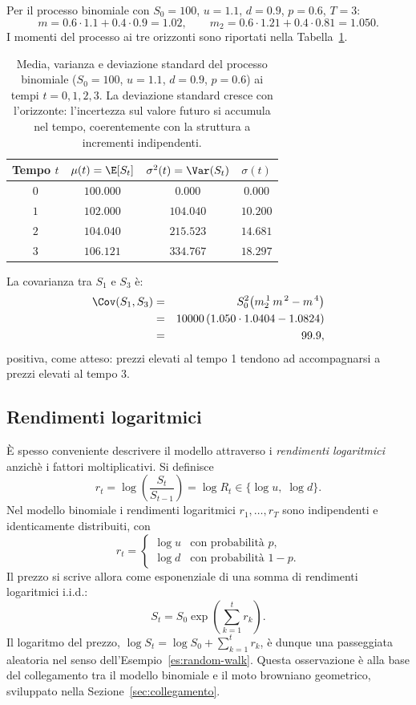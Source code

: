 \begin{example}
\label{es:momenti-binomiale}
Per il processo binomiale con $S_0=100$, $u=1.1$, $d=0.9$, $p=0.6$,
$T=3$:
\[
m=0.6\cdot 1.1+0.4\cdot 0.9=1.02,
\qquad
m_2=0.6\cdot 1.21+0.4\cdot 0.81=1.050.
\]
I momenti del processo ai tre orizzonti sono riportati nella
Tabella~\ref{tab:momenti-binomiale}.

\begin{table}[h]
\centering
\begin{tabular}{|c|c|c|c|}
\hline
\textbf{Tempo} $t$ & $\mu(t)=\E[S_t]$ &
$\sigma^2(t)=\Var(S_t)$ & $\sigma(t)$\\
\hline
$0$ & $100.000$ & $0.000$ & $0.000$\\
$1$ & $102.000$ & $104.040$ & $10.200$\\
$2$ & $104.040$ & $215.523$ & $14.681$\\
$3$ & $106.121$ & $334.767$ & $18.297$\\
\hline
\end{tabular}
\caption{Media, varianza e deviazione standard del processo binomiale
($S_0=100$, $u=1.1$, $d=0.9$, $p=0.6$) ai tempi $t=0,1,2,3$. La
deviazione standard cresce con l'orizzonte: l'incertezza sul valore
futuro si accumula nel tempo, coerentemente con la struttura a
incrementi indipendenti.}
\label{tab:momenti-binomiale}
\end{table}

La covarianza tra $S_1$ e $S_3$ \`{e}:
\begin{eqnarray*}
\Cov(S_1,S_3)
&=& S_0^2\bigl(m_2^{\,1}\,m^{\,2}-m^{\,4}\bigr)\\
&=& 10000\,(1.050\cdot 1.0404-1.0824)\\
&=& 99.9,
\end{eqnarray*}
positiva, come atteso: prezzi elevati al tempo 1 tendono ad
accompagnarsi a prezzi elevati al tempo 3.
\end{example}

\subsection{Rendimenti logaritmici}

\noindent
\`{E} spesso conveniente descrivere il modello attraverso i
\emph{rendimenti logaritmici} anzich\`{e} i fattori moltiplicativi.
Si definisce
\[
r_t=\log\!\left(\frac{S_t}{S_{t-1}}\right)=\log R_t
\in\{\log u,\;\log d\}.
\]
Nel modello binomiale i rendimenti logaritmici $r_1,\ldots,r_T$ sono
indipendenti e identicamente distribuiti, con
\[
r_t=\begin{cases}
\log u & \text{con probabilit\`{a} }p,\\
\log d & \text{con probabilit\`{a} }1-p.
\end{cases}
\]
Il prezzo si scrive allora come esponenziale di una somma di
rendimenti logaritmici i.i.d.:
\[
S_t=S_0\exp\!\left(\sum_{k=1}^{t}r_k\right).
\]
Il logaritmo del prezzo, $\log S_t=\log S_0+\sum_{k=1}^{t}r_k$, \`{e}
dunque una passeggiata aleatoria nel senso dell'Esempio~\ref{es:random-walk}.
Questa osservazione \`{e} alla base del collegamento tra il modello
binomiale e il moto browniano geometrico, sviluppato nella
Sezione~\ref{sec:collegamento}.

